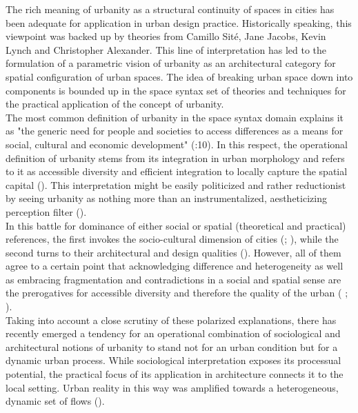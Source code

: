 \documentclass[11pt]{report}
\begin{document}
{{{The rich meaning of urbanity as a structural continuity of spaces in cities has been adequate for application in urban design practice. Historically speaking, this viewpoint was backed up by theories from Camillo Sité, Jane Jacobs, Kevin Lynch and Christopher Alexander.
This line of interpretation has led to the formulation of a parametric vision of urbanity as an architectural category for spatial configuration of urban spaces.
The idea of breaking urban space down into components is bounded up in the space syntax set of theories and techniques for the practical application of the concept of urbanity.
\\

The most common definition of urbanity in the space syntax domain explains it as "the generic need for people and societies to access differences as a means for social, cultural and economic development" (\href{Marcus}{\citealt{marcus_spatial_2007}}:10).
In this respect, the operational definition of urbanity stems from its integration in urban morphology  and refers to it as accessible diversity and efficient integration to locally capture the spatial capital (\href{Marcus}{\cite{marcus_spatial_2007}}).
This interpretation might be easily politicized and rather reductionist by seeing urbanity as nothing more than an instrumentalized, aestheticizing perception filter (\href{Wuest}{\citealt{wust_urbanity_2005}}).
\\

In this battle for dominance of either social or spatial (theoretical and practical) references, the first invokes the socio-cultural dimension of cities (\href{ref}{\cite{haussermann_urbanitet:_1992}}; \href{ref}{ \citealt{Christiaanse 2000}}), while the second turns to their architectural and design qualities (\cite{Neuffer 1976}).
However, all of them agree to a certain point that acknowledging difference and heterogeneity as well as embracing fragmentation and contradictions in a social and spatial sense are the prerogatives for accessible diversity and therefore the quality of the urban (\cite{(Durth 1986: Krämer-Badoni 1996} \href{Wuest}{\citealt{wust_urbanity_2005}}; \href{Markus}{\cite{marcus_spatial_2007}}). 
\\

Taking into account a close scrutiny of these polarized explanations, there has recently emerged a tendency for an operational combination of sociological and architectural notions of urbanity to stand not for an urban condition but for a dynamic urban process.
While sociological interpretation exposes its processual potential, the practical focus of its application in architecture connects it to the local setting.
Urban reality in this way was amplified towards a heterogeneous, dynamic set of flows (\href{de Aguiar}{\citealt{de_aguiar_douglas_vieira_what_2013}}).
\\

}}}
\end{document}
